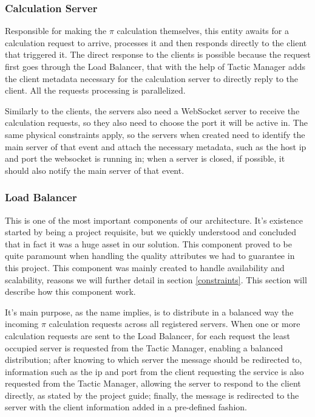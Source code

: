 \documentclass[12pt]{article}
\begin{document}
\subsubsection{Calculation Server}
Responsible for making the $\pi$ calculation themselves, this entity awaits for a calculation request to arrive, processes it and then responds directly to the client that triggered it. The direct response to the clients is possible because the request first goes through the Load Balancer, that with the help of Tactic Manager adds the client metadata necessary for the calculation server to directly reply to the client. All the requests processing is parallelized.

Similarly to the clients, the servers also need a WebSocket server to receive the calculation requests, so they also need to choose the port it will be active in. The same physical constraints apply, so the servers when created need to identify the main server of that event and attach the necessary metadata, such as the host ip and port the websocket is running in; when a server is closed, if possible, it should also notify the main server of that event.

\subsubsection{Load Balancer} \label{lb}
This is one of the most important components of our architecture. It's existence started by being a project requisite, but we quickly understood and concluded that in fact it was a huge asset in our solution. This component proved to be quite paramount when handling the quality attributes we had to guarantee in this project. This component was mainly created to handle availability and scalability, reasons we will further detail in section \ref{constraints}. This section will describe how this component work.

It's main purpose, as the name implies, is to distribute in a balanced way the incoming $\pi$ calculation requests across all registered servers. When one or more calculation requests are sent to the Load Balancer, for each request the least occupied server is requested from the Tactic Manager, enabling a balanced distribution; after knowing to which server the message should be redirected to, information such as the ip and port from the client requesting the service is also requested from the Tactic Manager, allowing the server to respond to the client directly, as stated by the project guide; finally, the message is redirected to the server with the client information added in a pre-defined fashion.
\end{document}
